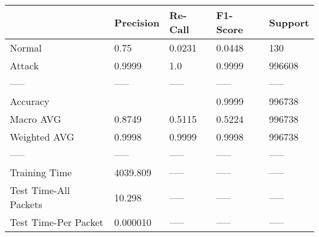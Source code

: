 \begin{tabular}{lllll}
\toprule
{} & Precision & Re-Call & F1-Score & Support \\
\midrule
Normal                &      0.75 &  0.0231 &   0.0448 &     130 \\
Attack                &    0.9999 &     1.0 &   0.9999 &  996608 \\
-----                 &     ----- &   ----- &    ----- &   ----- \\
Accuracy              &           &         &   0.9999 &  996738 \\
Macro AVG             &    0.8749 &  0.5115 &   0.5224 &  996738 \\
Weighted AVG          &    0.9998 &  0.9999 &   0.9998 &  996738 \\
-----                 &     ----- &   ----- &    ----- &   ----- \\
Training Time         &  4039.809 &   ----- &    ----- &   ----- \\
Test Time-All Packets &    10.298 &   ----- &    ----- &   ----- \\
Test Time-Per Packet  &  0.000010 &   ----- &    ----- &   ----- \\
\bottomrule
\end{tabular}
